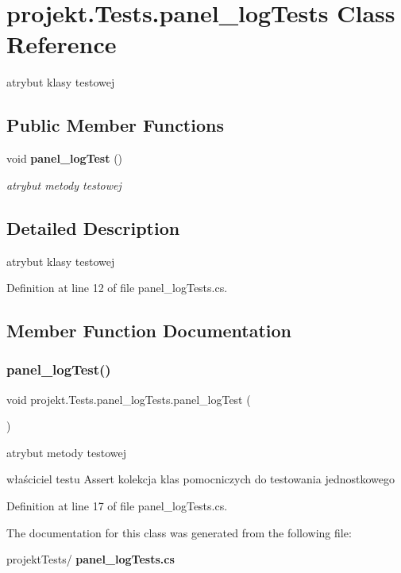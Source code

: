\section{projekt.\+Tests.\+panel\+\_\+log\+Tests Class Reference}
\label{classprojekt_1_1Tests_1_1panel__logTests}


atrybut klasy testowej  


\subsection*{Public Member Functions}
\begin{DoxyCompactItemize}
\item 
void \textbf{ panel\+\_\+log\+Test} ()
\begin{DoxyCompactList}\small\item\em atrybut metody testowej \end{DoxyCompactList}\end{DoxyCompactItemize}


\subsection{Detailed Description}
atrybut klasy testowej 

Definition at line 12 of file panel\+\_\+log\+Tests.\+cs.



\subsection{Member Function Documentation}
\mbox{\label{classprojekt_1_1Tests_1_1panel__logTests_acd1fb478675bc744fb08dcbbce12bf26}} 
\subsubsection{panel\+\_\+log\+Test()}
{\footnotesize\ttfamily void projekt.\+Tests.\+panel\+\_\+log\+Tests.\+panel\+\_\+log\+Test (\begin{DoxyParamCaption}{ }\end{DoxyParamCaption})\hspace{0.3cm}{\ttfamily [inline]}}



atrybut metody testowej 

właściciel testu Assert kolekcja klas pomocniczych do testowania jednostkowego 

Definition at line 17 of file panel\+\_\+log\+Tests.\+cs.



The documentation for this class was generated from the following file\+:\begin{DoxyCompactItemize}
\item 
projekt\+Tests/\textbf{ panel\+\_\+log\+Tests.\+cs}\end{DoxyCompactItemize}
